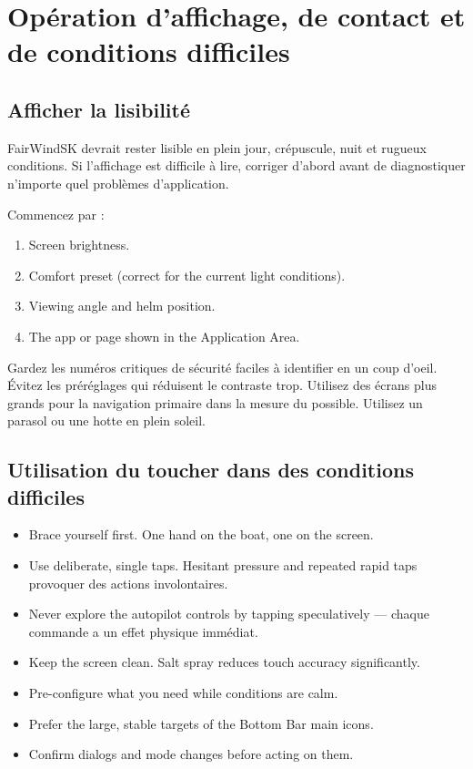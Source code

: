 \chapter{Opération d'affichage, de contact et de conditions difficiles}
\label{ch:roughconditions}

\section{Afficher la lisibilité}

FairWindSK devrait rester lisible en plein jour, crépuscule, nuit et rugueux
conditions.
Si l'affichage est difficile à lire, corriger d'abord avant de diagnostiquer n'importe quel
problèmes d'application.

Commencez par :
\begin{enumerate}
  \item Screen brightness.
  \item Comfort preset (correct for the current light conditions).
  \item Viewing angle and helm position.
  \item The app or page shown in the Application Area.
\end{enumerate}

Gardez les numéros critiques de sécurité faciles à identifier en un coup d'oeil.
Évitez les préréglages qui réduisent le contraste trop.
Utilisez des écrans plus grands pour la navigation primaire dans la mesure du possible.
Utilisez un parasol ou une hotte en plein soleil.

\section{Utilisation du toucher dans des conditions difficiles}

\begin{itemize}
  \item Brace yourself first. One hand on the boat, one on the screen.
  \item Use deliberate, single taps. Hesitant pressure and repeated rapid taps
provoquer des actions involontaires.
  \item Never explore the autopilot controls by tapping speculatively ---
chaque commande a un effet physique immédiat.
  \item Keep the screen clean. Salt spray reduces touch accuracy significantly.
  \item Pre-configure what you need while conditions are calm.
  \item Prefer the large, stable targets of the Bottom Bar main icons.
  \item Confirm dialogs and mode changes before acting on them.
\end{itemize}

